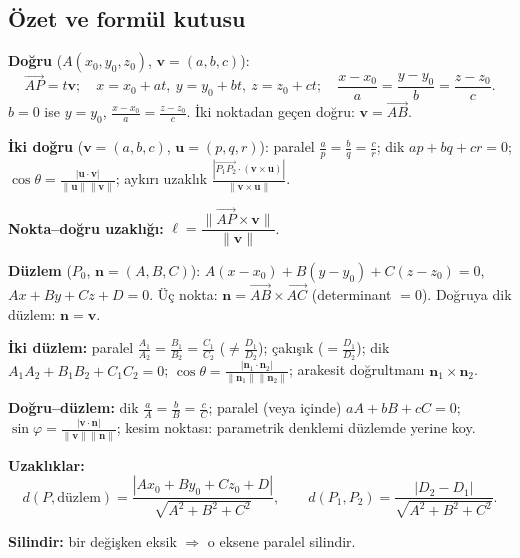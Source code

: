 \subsection{Özet ve formül kutusu}

\begin{ozet}
\textbf{Doğru} ($A(x_0,y_0,z_0)$, $\mathbf v=(a,b,c)$):
\[ \overrightarrow{AP}=t\mathbf v;\quad x=x_0+at,\ y=y_0+bt,\ z=z_0+ct;\quad \frac{x-x_0}{a}=\frac{y-y_0}{b}=\frac{z-z_0}{c}. \]
$b=0$ ise $y=y_0$, $\frac{x-x_0}{a}=\frac{z-z_0}{c}$. İki noktadan geçen doğru: $\mathbf v=\overrightarrow{AB}$.

\textbf{İki doğru} ($\mathbf v=(a,b,c)$, $\mathbf u=(p,q,r)$): paralel $\frac ap=\frac bq=\frac cr$; dik $ap+bq+cr=0$;
$\cos\theta=\frac{|\mathbf u\cdot\mathbf v|}{\|\mathbf u\|\|\mathbf v\|}$; aykırı uzaklık $\frac{|\overrightarrow{P_1P_2}\cdot(\mathbf v\times\mathbf u)|}{\|\mathbf v\times\mathbf u\|}$.

\textbf{Nokta--doğru uzaklığı:} $\ell=\dfrac{\|\overrightarrow{AP}\times\mathbf v\|}{\|\mathbf v\|}$.

\textbf{Düzlem} ($P_0$, $\mathbf n=(A,B,C)$): $A(x-x_0)+B(y-y_0)+C(z-z_0)=0$, $Ax+By+Cz+D=0$.
Üç nokta: $\mathbf n=\overrightarrow{AB}\times\overrightarrow{AC}$ (determinant $=0$). Doğruya dik düzlem: $\mathbf n=\mathbf v$.

\textbf{İki düzlem:} paralel $\frac{A_1}{A_2}=\frac{B_1}{B_2}=\frac{C_1}{C_2}$ ($\neq\frac{D_1}{D_2}$); çakışık ($=\frac{D_1}{D_2}$); dik $A_1A_2+B_1B_2+C_1C_2=0$;
$\cos\theta=\frac{|\mathbf n_1\cdot\mathbf n_2|}{\|\mathbf n_1\|\|\mathbf n_2\|}$; arakesit doğrultmanı $\mathbf n_1\times\mathbf n_2$.

\textbf{Doğru--düzlem:} dik $\frac aA=\frac bB=\frac cC$; paralel (veya içinde) $aA+bB+cC=0$; $\sin\varphi=\frac{|\mathbf v\cdot\mathbf n|}{\|\mathbf v\|\|\mathbf n\|}$; kesim noktası: parametrik denklemi düzlemde yerine koy.

\textbf{Uzaklıklar:}
\[ d(P,\text{düzlem})=\frac{|Ax_0+By_0+Cz_0+D|}{\sqrt{A^2+B^2+C^2}},\qquad d(P_1,P_2)=\frac{|D_2-D_1|}{\sqrt{A^2+B^2+C^2}}. \]

\textbf{Silindir:} bir değişken eksik $\Rightarrow$ o eksene paralel silindir.


\end{ozet}
